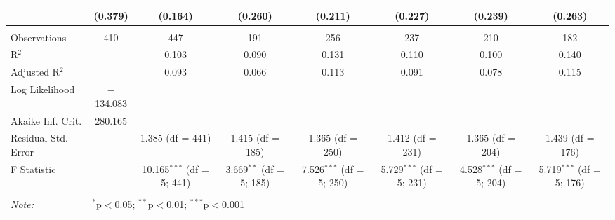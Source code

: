 \begin{table}[H]
\begin{tabular}{@{\extracolsep{5pt}}lccccccc}
  & (0.379) & (0.164) & (0.260) & (0.211) & (0.227) & (0.239) & (0.263) \\ 
 \hline \\[-1.8ex] 
Observations & 410 & 447 & 191 & 256 & 237 & 210 & 182 \\ 
R$^{2}$ &  & 0.103 & 0.090 & 0.131 & 0.110 & 0.100 & 0.140 \\ 
Adjusted R$^{2}$ &  & 0.093 & 0.066 & 0.113 & 0.091 & 0.078 & 0.115 \\ 
Log Likelihood & $-$134.083 &  &  &  &  &  &  \\ 
Akaike Inf. Crit. & 280.165 &  &  &  &  &  &  \\ 
Residual Std. Error &  & 1.385 (df = 441) & 1.415 (df = 185) & 1.365 (df = 250) & 1.412 (df = 231) & 1.365 (df = 204) & 1.439 (df = 176) \\ 
F Statistic &  & 10.165$^{***}$ (df = 5; 441) & 3.669$^{**}$ (df = 5; 185) & 7.526$^{***}$ (df = 5; 250) & 5.729$^{***}$ (df = 5; 231) & 4.528$^{***}$ (df = 5; 204) & 5.719$^{***}$ (df = 5; 176) \\ 
\hline 
\hline \\[-1.8ex] 
\textit{Note:}  & \multicolumn{7}{l}{$^{*}$p$<$0.05; $^{**}$p$<$0.01; $^{***}$p$<$0.001} \\ 
\end{tabular} 
\end{table} 
